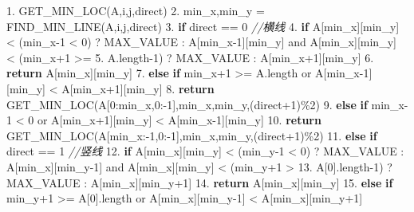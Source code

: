 \documentclass[
]{article}
\newenvironment{Shaded}{}{}
\newcommand{\CommentTok}[1]{\textcolor[rgb]{0.38,0.63,0.69}{\textit{#1}}}
\newcommand{\ControlFlowTok}[1]{\textcolor[rgb]{0.00,0.44,0.13}{\textbf{#1}}}
\newcommand{\DecValTok}[1]{\textcolor[rgb]{0.25,0.63,0.44}{#1}}
\newcommand{\FloatTok}[1]{\textcolor[rgb]{0.25,0.63,0.44}{#1}}
\newcommand{\NormalTok}[1]{#1}
\begin{document}
\begin{Shaded}
\begin{Highlighting}[]
\FloatTok{1.}\NormalTok{ GET\_MIN\_LOC(A,i,j,direct)}
\FloatTok{2.}\NormalTok{ 	min\_x,min\_y = FIND\_MIN\_LINE(A,i,j,direct)}
\FloatTok{3.} 	\ControlFlowTok{if}\NormalTok{ direct == }\DecValTok{0} \CommentTok{//横线}
\FloatTok{4.}		\ControlFlowTok{if}\NormalTok{ A[min\_x][min\_y] \textless{} (min\_x{-}}\DecValTok{1}\NormalTok{ \textless{} }\DecValTok{0}\NormalTok{) ? MAX\_VALUE : A[min\_x{-}}\DecValTok{1}\NormalTok{][min\_y] and A[min\_x][min\_y] \textless{} (min\_x+}\DecValTok{1}\NormalTok{ \textgreater{}= 	                       }\FloatTok{5.}\NormalTok{			  A.length{-}}\DecValTok{1}\NormalTok{) ? MAX\_VALUE : A[min\_x+}\DecValTok{1}\NormalTok{][min\_y]}
\FloatTok{6.} 			\ControlFlowTok{return}\NormalTok{ A[min\_x][min\_y]}
\FloatTok{7.} 		\ControlFlowTok{else} \ControlFlowTok{if}\NormalTok{ min\_x+}\DecValTok{1}\NormalTok{ \textgreater{}= A.length or A[min\_x{-}}\DecValTok{1}\NormalTok{][min\_y] \textless{} A[min\_x+}\DecValTok{1}\NormalTok{][min\_y]}
\FloatTok{8.} 			\ControlFlowTok{return}\NormalTok{ GET\_MIN\_LOC(A[}\DecValTok{0}\NormalTok{:min\_x,}\DecValTok{0}\NormalTok{:{-}}\DecValTok{1}\NormalTok{],min\_x,min\_y,(direct+}\DecValTok{1}\NormalTok{)\%}\DecValTok{2}\NormalTok{)}
\FloatTok{9.} 		\ControlFlowTok{else} \ControlFlowTok{if}\NormalTok{ min\_x{-}}\DecValTok{1}\NormalTok{ \textless{} }\DecValTok{0}\NormalTok{ or A[min\_x+}\DecValTok{1}\NormalTok{][min\_y] \textless{} A[min\_x{-}}\DecValTok{1}\NormalTok{][min\_y]}
\FloatTok{10.}			\ControlFlowTok{return}\NormalTok{ GET\_MIN\_LOC(A[min\_x:{-}}\DecValTok{1}\NormalTok{,}\DecValTok{0}\NormalTok{:{-}}\DecValTok{1}\NormalTok{],min\_x,min\_y,(direct+}\DecValTok{1}\NormalTok{)\%}\DecValTok{2}\NormalTok{)}
\FloatTok{11.}	\ControlFlowTok{else} \ControlFlowTok{if}\NormalTok{ direct == }\DecValTok{1} \CommentTok{//竖线}
\FloatTok{12.}		\ControlFlowTok{if}\NormalTok{ A[min\_x][min\_y] \textless{} (min\_y{-}}\DecValTok{1}\NormalTok{ \textless{} }\DecValTok{0}\NormalTok{) ? MAX\_VALUE : A[min\_x][min\_y{-}}\DecValTok{1}\NormalTok{] and A[min\_x][min\_y] \textless{} (min\_y+}\DecValTok{1}\NormalTok{ \textgreater{}       }\FloatTok{13.}\NormalTok{				 A[}\DecValTok{0}\NormalTok{].length{-}}\DecValTok{1}\NormalTok{) ? MAX\_VALUE : A[min\_x][min\_y+}\DecValTok{1}\NormalTok{]}
\FloatTok{14.}			\ControlFlowTok{return}\NormalTok{ A[min\_x][min\_y]}
\FloatTok{15.}		\ControlFlowTok{else} \ControlFlowTok{if}\NormalTok{ min\_y+}\DecValTok{1}\NormalTok{ \textgreater{}= A[}\DecValTok{0}\NormalTok{].length or A[min\_x][min\_y{-}}\DecValTok{1}\NormalTok{] \textless{} A[min\_x][min\_y+}\DecValTok{1}\NormalTok{]}

\end{Highlighting}
\end{Shaded}
\end{document}
